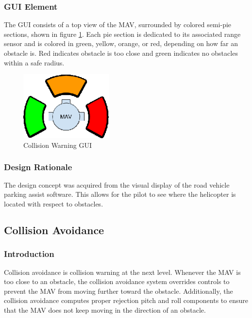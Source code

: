 \documentclass[onecolumn, draftclsnofoot, 10pt, compsoc]{IEEEtran}
\begin{document}
\subsubsection{GUI Element}
The GUI consists of a top view of the MAV, surrounded by colored semi-pie sections, shown in figure \ref{fig:ColWarGUI}. Each pie section is dedicated to its associated range sensor and is colored in green, yellow, orange, or red, depending on how far an obstacle is. Red indicates obstacle is too close and green indicates no obstacles within a safe radius.
\begin{figure}[h]
    \centering
    \includegraphics[height=3.5cm]{graphics/collision_warning_gui.eps}
    \caption{Collision Warning GUI}
    \label{fig:ColWarGUI}
\end{figure}

\subsubsection{Design Rationale}
The design concept was acquired from the visual display of the road vehicle parking assist software. This allows for the pilot to see where the helicopter is located with respect to obstacles.

\subsection{Collision Avoidance}
\subsubsection{Introduction}
Collision avoidance is collision warning at the next level. Whenever the MAV is too close to an obstacle, the collision avoidance system overrides controls to prevent the MAV from moving further toward the obstacle. Additionally, the collision avoidance computes proper rejection pitch and roll components to ensure that the MAV does not keep moving in the direction of an obstacle.
\end{document}
